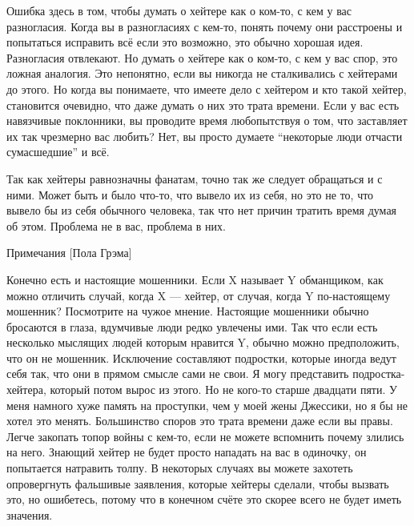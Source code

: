 \documentclass[ebook,12pt,oneside,openany]{memoir}
\begin{document}
Ошибка здесь в том, чтобы думать о хейтере как о ком-то, с кем у вас
разногласия. Когда вы в разногласиях с кем-то, понять почему они
расстроены и попытаться исправить всё если это возможно, это обычно
хорошая идея. Разногласия отвлекают. Но думать о хейтере как о ком-то,
с кем у вас спор, это ложная аналогия. Это непонятно, если вы никогда
не сталкивались с хейтерами до этого. Но когда вы понимаете, что
имеете дело с хейтером и кто такой хейтер, становится очевидно, что
даже думать о них это трата времени. Если у вас есть навязчивые
поклонники, вы проводите время любопытствуя о том, что заставляет их
так чрезмерно вас любить? Нет, вы просто думаете “некоторые люди
отчасти сумасшедшие” и всё.


Так как хейтеры равнозначны фанатам, точно так же следует обращаться и
с ними. Может быть и было что-то, что вывело их из себя, но это не то,
что вывело бы из себя обычного человека, так что нет причин тратить
время думая об этом. Проблема не в вас, проблема в них.


Примечания [Пола Грэма]

Конечно есть и настоящие мошенники. Если X называет Y обманщиком, как
можно отличить случай, когда X — хейтер, от случая, когда Y
по-настоящему мошенник? Посмотрите на чужое мнение. Настоящие
мошенники обычно бросаются в глаза, вдумчивые люди редко увлечены ими.
Так что если есть несколько мыслящих людей которым нравится Y, обычно
можно предположить, что он не мошенник. Исключение составляют
подростки, которые иногда ведут себя так, что они в прямом смысле сами
не свои. Я могу представить подростка-хейтера, который потом вырос из
этого. Но не кого-то старше двадцати пяти. У меня намного хуже память
на проступки, чем у моей жены Джессики, но я бы не хотел это менять.
Большинство споров это трата времени даже если вы правы. Легче
закопать топор войны с кем-то, если не можете вспомнить почему злились
на него. Знающий хейтер не будет просто нападать на вас в одиночку, он
попытается натравить толпу. В некоторых случаях вы можете захотеть
опровергнуть фальшивые заявления, которые хейтеры сделали, чтобы
вызвать это, но ошибетесь, потому что в конечном счёте это скорее
всего не будет иметь значения.
\end{document}
